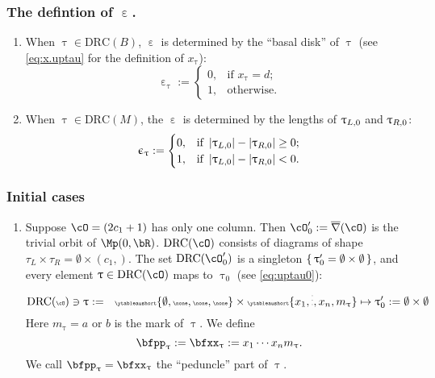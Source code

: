 \documentclass[12pt,a4paper]{amsart}
\def\abs#1{\left|{#1}\right|}
\def\eDD{\overline{\nabla}}
\numberwithin{equation}{section}
\theoremstyle{remark}
\def\drc{\mathrm{DRC}}
\let\ytb=\ytableaushort
\def\cOp{\cO^{\prime}}
\def\uptaup{\uptau^{\prime}}
\begin{document}
\subsubsection{The defintion of $\upepsilon$.} \label{sec:upepsilon}
\begin{enumerate}[label=(\arabic*).,series=alg2]
  \item When $\uptau\in \drc(B)$, $\upepsilon$ is determined by the ``basal
  disk'' of $\uptau$ (see \eqref{eq:x.uptau} for the definition of $x_{\uptau}$):
  \[
    \upepsilon_{\uptau}:=
    \begin{cases}
      0, & \text{if $x_{\uptau}=d$;} \\
      1, & \text{otherwise.}
    \end{cases}
  \]
  \item When $\uptau\in \drc(M)$, the  $\upepsilon$  is determined by
  the lengths of $\uptau_{L,0}$ and $\uptau_{R,0}$:
  \[
    \upepsilon_{\uptau} :=
    \begin{cases}
      0, & \text{if }\abs{\taulf} - \abs{\taurf} \geq  0;\\
      1, & \text{if }\abs{\taulf} - \abs{\taurf}<0.
    \end{cases}
  \]
\end{enumerate}


\subsubsection{Initial cases}

\begin{enumerate}[resume*=alg2]
  \item Suppose $\cO = (2c_{1}+1)$ has only one column. Then
        $\cOp_{0}:=\eDD(\cO)$ is the trivial orbit of $\Mp(0,\bR)$. $\drc(\cO)$
        consists of diagrams of shape
        $\tau_{L}\times \tau_{R} =\emptyset\times (c_{1},)$.
        The set $\drc(\cOp_{0})$ is a singleton $\set{\uptaup_{0}=\emptyset\times \emptyset}$, and every element
        $\uptau \in \drc(\cO)$ maps to $\uptau_{0}$ (see \eqref{eq:uptau0}):
        \[\tiny
          \drc(\cO)\ni \uptau:= \hspace{1em} \ytb{\emptyset,\none,\none,\none}
          \times \ytb{{x_{1}},\vdots,{x_{n}},{m_{\uptau}}}
          \mapsto \uptaup_{0}:=\emptyset\times \emptyset
        \]
        Here $m_{\uptau}=a$ or $b$ is the mark of $\uptau$.
        We define
        \[
          \bfpp_{\uptau}:=\bfxx_{\uptau} := x_{1}\cdots x_{n} m_{\uptau}.%
        \]
        We call $\bfpp_{\uptau}=\bfxx_{\uptau}$ the ``peduncle'' part of
        $\uptau$.
\end{enumerate}
\end{document}
